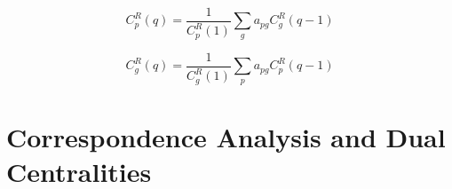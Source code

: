 \documentclass[a4paper,fleqn]{cas-sc}
\begin{document}
\begin{equation}   
    C^R_p(q) = \frac{1}{C^R_p(1)}\sum_g a_{pg}C^R_g(q-1) 
   \label{eq:Rq_p}
\end{equation}

\begin{equation}
   C^R_g(q) = \frac{1}{C^R_g(1)}\sum_p a_{pg}C^R_p(q-1)
   \label{eq:Rq_g}
\end{equation}

\section{Correspondence Analysis and Dual Centralities}

%


\end{document}
